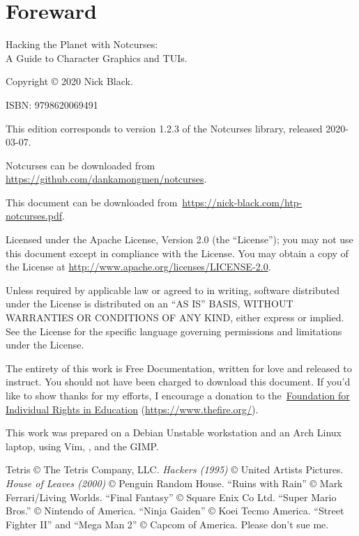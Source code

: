 \documentclass[letterpaper,10pt]{article}
\begin{document}
\cleardoublepage
{}
{}
\listoffigures
{}
\listoflistings
{}
\listoftables
\clearpage

\newpage
\section{Foreward}
Hacking the Planet with Notcurses:\\
A Guide to Character Graphics and TUIs.

Copyright © 2020 Nick Black.

ISBN: 9798620069491

This edition corresponds to version 1.2.3 of the Notcurses
library, released 2020-03-07.

Notcurses can be downloaded from
\url{https://github.com/dankamongmen/notcurses}.

This document can be downloaded
from~\url{https://nick-black.com/htp-notcurses.pdf}.

Licensed under the Apache License, Version 2.0 (the ``License''); you may not
use this document except in compliance with the License. You may obtain a copy
of the License at \url{http://www.apache.org/licenses/LICENSE-2.0}.

Unless required by applicable law or agreed to in writing, software
distributed under the License is distributed on an ``AS IS'' BASIS,
WITHOUT WARRANTIES OR CONDITIONS OF ANY KIND, either express or implied.
See the License for the specific language governing permissions and
limitations under the License.

The entirety of this work is Free Documentation, written for love and released
to instruct. You should not have been charged to download this document. If
you'd like to show thanks for my efforts, I encourage a donation to
the~\href{https://www.thefire.org/}{Foundation for Individual Rights in Education} (\url{https://www.thefire.org/}).

This work was prepared on a Debian Unstable workstation and an Arch Linux laptop,
using Vim, \XeLaTeX, and the GIMP.

Tetris © The Tetris Company, LLC.
\textit{Hackers (1995)} © United Artists Pictures.
\textit{House of Leaves (2000)} © Penguin Random House.
``Ruins with Rain'' © Mark Ferrari/Living Worlds.
``Final Fantasy'' © Square Enix Co Ltd.
``Super Mario Bros.'' © Nintendo of America.
``Ninja Gaiden'' © Koei Tecmo America.
``Street Fighter II'' and ``Mega Man 2'' © Capcom of America.
Please don't sue me.
\end{document}
